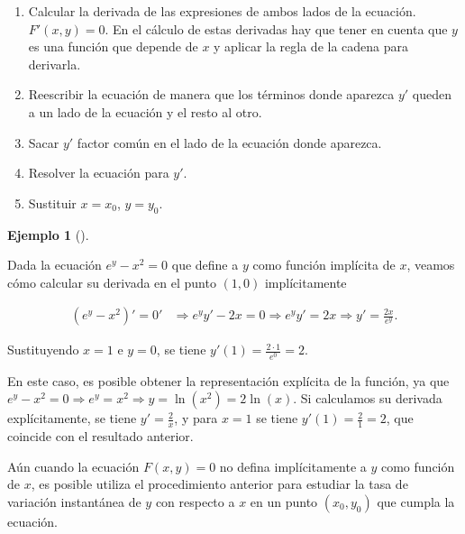 \documentclass[
  a4paper,
]{scrreport}
\theoremstyle{definition}
\newtheorem{example}{Ejemplo}[chapter]
\theoremstyle{plain}
\theoremstyle{definition}
\theoremstyle{definition}
\theoremstyle{plain}
\theoremstyle{plain}
\theoremstyle{remark}
\begin{document}
\begin{enumerate}
\def\labelenumi{\arabic{enumi}.}
\item
  Calcular la derivada de las expresiones de ambos lados de la ecuación.
  \(F'(x,y)=0\). En el cálculo de estas derivadas hay que tener en
  cuenta que \(y\) es una función que depende de \(x\) y aplicar la
  regla de la cadena para derivarla.
\item
  Reescribir la ecuación de manera que los términos donde aparezca
  \(y'\) queden a un lado de la ecuación y el resto al otro.
\item
  Sacar \(y'\) factor común en el lado de la ecuación donde aparezca.
\item
  Resolver la ecuación para \(y'\).
\item
  Sustituir \(x=x_0\), \(y=y_0\).
\end{enumerate}

\begin{example}[]\protect\hypertarget{exm-derivada-implicita}{}\label{exm-derivada-implicita}

Dada la ecuación \(e^y-x^2=0\) que define a \(y\) como función implícita
de \(x\), veamos cómo calcular su derivada en el punto \((1,0)\)
implícitamente

\begin{align*}
(e^y-x^2)' = 0' &\Rightarrow e^yy'-2x = 0 \Rightarrow e^yy' = 2x \Rightarrow y' = \frac{2x}{e^y}.
\end{align*}

Sustituyendo \(x=1\) e \(y=0\), se tiene
\(y'(1) = \frac{2\cdot 1}{e^0} = 2\).

En este caso, es posible obtener la representación explícita de la
función, ya que
\(e^y-x^2=0 \Rightarrow e^y=x^2 \Rightarrow y=\ln(x^2) = 2\ln(x)\). Si
calculamos su derivada explícitamente, se tiene \(y'=\frac{2}{x}\), y
para \(x=1\) se tiene \(y'(1) = \frac{2}{1}=2\), que coincide con el
resultado anterior.

\end{example}

Aún cuando la ecuación \(F(x,y)=0\) no defina implícitamente a \(y\)
como función de \(x\), es posible utiliza el procedimiento anterior para
estudiar la tasa de variación instantánea de \(y\) con respecto a \(x\)
en un punto \((x_0, y_0)\) que cumpla la ecuación.
\end{document}
